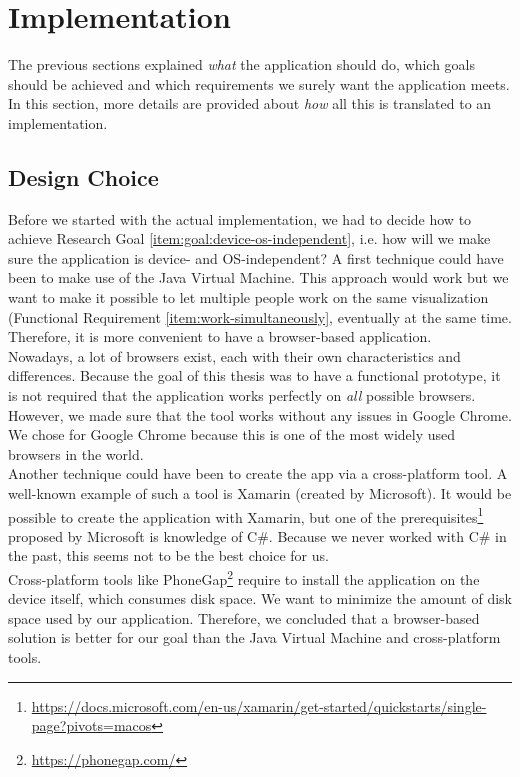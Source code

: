\chapter{Implementation}\label{ch:implementation}

The previous sections explained \textit{what} the application should do, which goals should be achieved and which requirements we surely want the application meets. In this section, more details are provided about \textit{how} all this is translated to an implementation.

\section{Design Choice}
Before we started with the actual implementation, we had to decide how to achieve Research Goal \ref{item:goal:device-os-independent}, i.e. how will we make sure the application is device- and OS-independent? A first technique could have been to make use of the Java Virtual Machine. This approach would work but we want to make it possible to let multiple people work on the same visualization (Functional Requirement \ref{item:work-simultaneously}, eventually at the same time. Therefore, it is more convenient to have a browser-based application.\\

Nowadays, a lot of browsers exist, each with their own characteristics and differences. Because the goal of this thesis was to have a functional prototype, it is not required that the application works perfectly on \textit{all} possible browsers. However, we made sure that the tool works without any issues in Google Chrome. We chose for Google Chrome because this is one of the most widely used browsers in the world.\\

Another technique could have been to create the app via a cross-platform tool. A well-known example of such a tool is Xamarin (created by Microsoft). It would be possible to create the application with Xamarin, but one of the prerequisites\footnote{\url{https://docs.microsoft.com/en-us/xamarin/get-started/quickstarts/single-page?pivots=macos}} proposed by Microsoft is knowledge of C\#. Because we never worked with C\# in the past, this seems not to be the best choice for us.\\

Cross-platform tools like PhoneGap\footnote{\url{https://phonegap.com/}} require to install the application on the device itself, which consumes disk space. We want to minimize the amount of disk space used by our application. Therefore, we concluded that a browser-based solution is better for our goal than the Java Virtual Machine and cross-platform tools.

